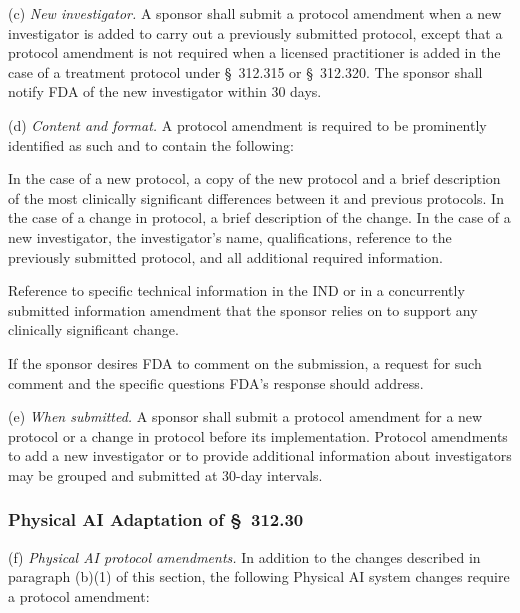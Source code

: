 \documentclass[11pt]{article}
\begin{document}
(c) \textit{New investigator.} A sponsor shall submit a protocol amendment when a new investigator is added to carry out a previously submitted protocol, except that a protocol amendment is not required when a licensed practitioner is added in the case of a treatment protocol under \S~312.315 or \S~312.320. The sponsor shall notify FDA of the new investigator within 30 days.

(d) \textit{Content and format.} A protocol amendment is required to be prominently identified as such and to contain the following:

\begin{description}[leftmargin=0.5cm,style=sameline]
\item[(1)] In the case of a new protocol, a copy of the new protocol and a brief description of the most clinically significant differences between it and previous protocols. In the case of a change in protocol, a brief description of the change. In the case of a new investigator, the investigator's name, qualifications, reference to the previously submitted protocol, and all additional required information.
\item[(2)] Reference to specific technical information in the IND or in a concurrently submitted information amendment that the sponsor relies on to support any clinically significant change.
\item[(3)] If the sponsor desires FDA to comment on the submission, a request for such comment and the specific questions FDA's response should address.
\end{description}

(e) \textit{When submitted.} A sponsor shall submit a protocol amendment for a new protocol or a change in protocol before its implementation. Protocol amendments to add a new investigator or to provide additional information about investigators may be grouped and submitted at 30-day intervals.

\subsubsection{Physical AI Adaptation of \S~312.30}

(f) \textit{Physical AI protocol amendments.} In addition to the changes described in paragraph (b)(1) of this section, the following Physical AI system changes require a protocol amendment:
\end{document}
